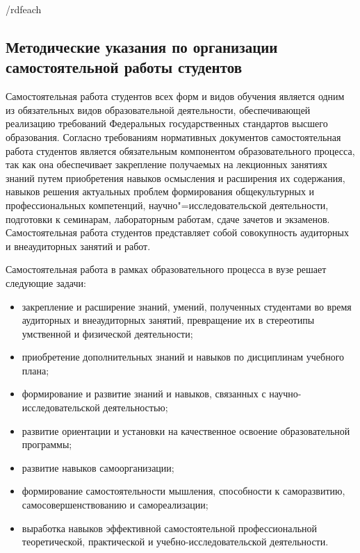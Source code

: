 \documentclass[12pt]{scrartcl}
\begin{document}


{{/rdfeach}}



\subsection{Методические указания по организации самостоятельной работы студентов} %

Самостоятельная работа студентов всех форм и видов обучения является одним из
обязательных видов образовательной деятельности, обеспечивающей реализацию
требований Федеральных государственных стандартов высшего образования. Согласно
требованиям нормативных документов самостоятельная работа студентов является
обязательным компонентом образовательного процесса, так как она обеспечивает
закрепление получаемых на лекционных занятиях знаний путем приобретения навыков
осмысления и расширения их содержания, навыков решения актуальных проблем
формирования общекультурных и профессиональных компетенций, научно"=исследовательской деятельности, подготовки к семинарам, лабораторным работам, сдаче зачетов и экзаменов. Самостоятельная работа студентов представляет собой совокупность
аудиторных и внеаудиторных занятий и работ.

Самостоятельная работа в рамках
образовательного процесса в вузе решает следующие задачи:
\begin{itemize}
\item закрепление и расширение знаний, умений, полученных студентами во время
аудиторных и внеаудиторных занятий, превращение их в стереотипы умственной и
физической деятельности;
\item приобретение дополнительных знаний и навыков по дисциплинам учебного плана;
\item формирование и развитие знаний и навыков, связанных с научно-исследовательской
деятельностью;
\item развитие ориентации и установки на качественное освоение образовательной
программы;
\item развитие навыков самоорганизации;
\item формирование самостоятельности мышления, способности к саморазвитию,
самосовершенствованию и самореализации;
\item выработка навыков эффективной самостоятельной профессиональной теоретической,
  практической и учебно-исследовательской деятельности.
\end{itemize}
\end{document}
